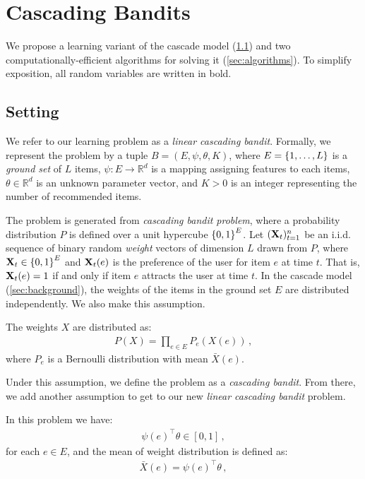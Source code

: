 
\section{Cascading Bandits}
\label{sec:cascading bandits}

We propose a learning variant of the cascade model (\cref{sec:setting}) and two computationally-efficient algorithms for solving it (\cref{sec:algorithms}). To simplify exposition, all random variables are written in bold.


\subsection{Setting}
\label{sec:setting}

We refer to our learning problem as a \emph{linear cascading bandit}. Formally, we represent the problem by a tuple $B = (E, \psi, \theta, K)$, where $E = \left\{1, \dots, L\right\}$ is a \emph{ground set} of $L$ items, $\psi : E \rightarrow \mathbb{R}^d$ is a mapping assigning features to each items, $\theta \in \mathbb{R}^d$ is an unknown parameter vector, and $K > 0$ is an integer representing the number of recommended items. 

The problem is generated from \emph{cascading bandit problem}, where a probability distribution $P$ is defined over a unit hypercube $\left\{0, 1\right\}^E$. Let $(\mathbf{X}_t)_{t = 1}^n$ be an i.i.d. sequence of binary random \emph{weight} vectors of dimension $L$ drawn from $P$, where $\mathbf{X}_t \in \left\{0, 1\right\}^E$ and $\mathbf{X}_t(e)$ is the preference of the user for item $e$ at time $t$. That is, $\mathbf{X}_t(e) = 1$ if and only if item $e$ attracts the user at time $t$. In the cascade model (\cref{sec:background}), the weights of the items in the ground set $E$ are distributed independently. We also make this assumption.

\begin{assumption}
\label{ass:independence} The weights $X$ are distributed as:
\begin{align*}
  P(X) = \prod_{e \in E} P_e(X(e))\,,
\end{align*}
where $P_e$ is a Bernoulli distribution with mean $\bar{X}(e)$.
\end{assumption}

Under this assumption, we define the problem as a \emph{cascading bandit}. From there, we add another assumption to get to our new \emph{linear cascading bandit} problem.

\begin{assumption}
\label{ass:probability} In this problem we have:
\begin{align*}
  \psi(e)^\top \theta \in [0,1] \,,
\end{align*}
for each $e \in E$, and the mean of weight distribution is defined as:
\begin{align*}
  \bar{X}(e) = \psi(e)^\top \theta \,,
\end{align*}
\end{assumption}

